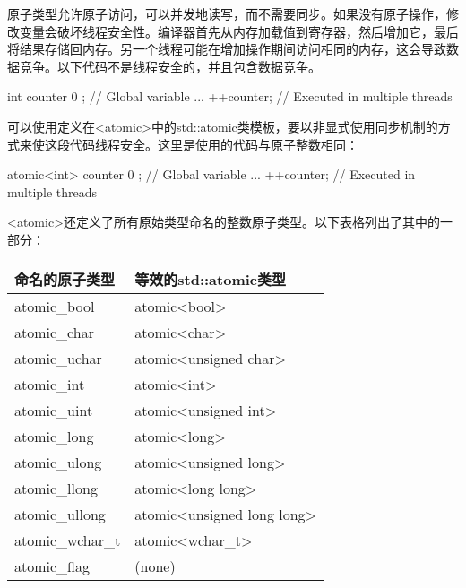 
原子类型允许原子访问，可以并发地读写，而不需要同步。如果没有原子操作，修改变量会破坏线程安全性。编译器首先从内存加载值到寄存器，然后增加它，最后将结果存储回内存。另一个线程可能在增加操作期间访问相同的内存，这会导致数据竞争。以下代码不是线程安全的，并且包含数据竞争。

\begin{cpp}
int counter { 0 }; // Global variable
...
++counter; // Executed in multiple threads
\end{cpp}

可以使用定义在<atomic>中的std::atomic类模板，要以非显式使用同步机制的方式来使这段代码线程安全。这里是使用的代码与原子整数相同：

\begin{cpp}
atomic<int> counter { 0 } ; // Global variable
...
++counter; // Executed in multiple threads
\end{cpp}

<atomic>还定义了所有原始类型命名的整数原子类型。以下表格列出了其中的一部分：

\begin{longtable}{|l|l|}
\hline
\textbf{命名的原子类型} & \textbf{等效的std::atomic类型}              \\ \hline
\endfirsthead
%
\endhead
%
atomic\_bool               & atomic\textless{}bool\textgreater{}               \\ \hline
atomic\_char               & atomic\textless{}char\textgreater{}               \\ \hline
atomic\_uchar              & atomic\textless{}unsigned char\textgreater{}      \\ \hline
atomic\_int                & atomic\textless{}int\textgreater{}                \\ \hline
atomic\_uint               & atomic\textless{}unsigned int\textgreater{}       \\ \hline
atomic\_long               & atomic\textless{}long\textgreater{}               \\ \hline
atomic\_ulong              & atomic\textless{}unsigned long\textgreater{}      \\ \hline
atomic\_llong              & atomic\textless{}long long\textgreater{}          \\ \hline
atomic\_ullong             & atomic\textless{}unsigned long long\textgreater{} \\ \hline
atomic\_wchar\_t           & atomic\textless{}wchar\_t\textgreater{}           \\ \hline
atomic\_flag               & (none)                                            \\ \hline
\end{longtable}

